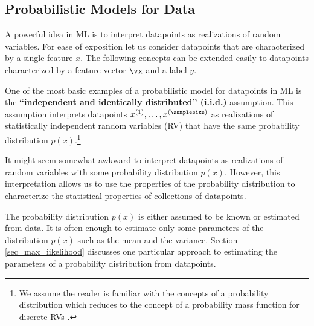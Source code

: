 \documentclass[12pt]{report}
\begin{document}

\subsection{Probabilistic Models for Data} 
\label{equ_prob_models_data}
A powerful idea in ML is to interpret datapoints as realizations of random variables. 
For ease of exposition let us consider datapoints that are characterized by a single feature $x$. 
The following concepts can be extended easily to datapoints characterized by 
a feature vector $\vx$ and a label $y$. 

One of the most basic examples of a probabilistic model for datapoints in ML is 
the {\bf ``independent and identically distributed'' (i.i.d.)} assumption. This assumption 
interprets datapoints $x^{(1)},\ldots,x^{(\samplesize)}$ as realizations of statistically independent 
random variables (RV) that have the same probability distribution $p(x)$.\footnote{We assume the reader 
	is familiar with the concepts of a probability distribution which reduces to the concept of a 
	probability mass function for discrete RVs \cite{}.}

It might seem somewhat awkward to interpret datapoints as realizations 
of random variables with some probability distribution $p(x)$. However, this 
interpretation allows us to use the properties of the probability distribution  
to characterize the statistical properties of collections of datapoints. 

The probability distribution $p(x)$ is either assumed to be 
known or estimated from data. It is often enough to estimate 
only some parameters of the distribution $p(x)$ such as the 
mean and the variance. Section \ref{sec_max_iikelihood} discusses 
one particular approach to estimating the parameters of a probability 
distribution from datapoints. 
\end{document}
